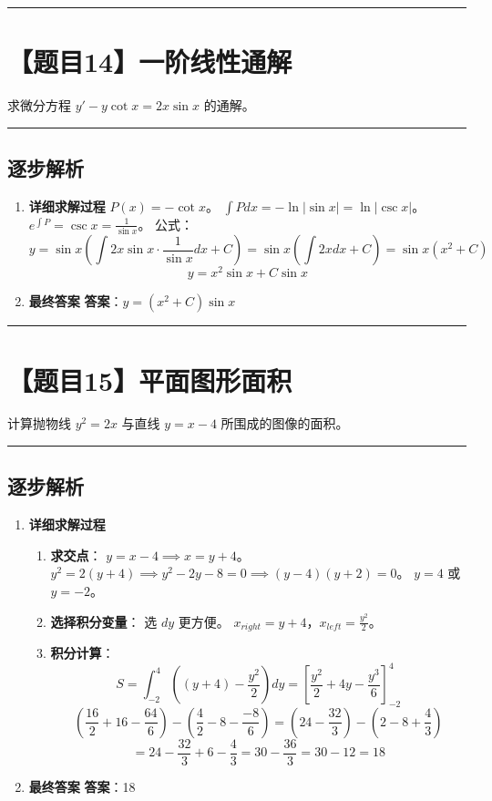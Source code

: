 \documentclass[UTF8]{ctexart}
\newenvironment{redenv}{\color{red}}{}
\newenvironment{detailedanalysis}{%
    \color{red}
    \begin{enumerate}[label=\textbf{第\arabic*步：}, leftmargin=*, align=left, itemsep=1.5ex]
}{%
    \end{enumerate}
}
\newcommand{\problemrule}{\noindent\rule{\textwidth}{1.5pt}\vspace{-0.8em}}
\newcommand{\analysisrule}{\noindent\rule{\textwidth}{0.8pt}\vspace{-0.8em}}
\begin{document}
\problemrule
\section*{【题目14】一阶线性通解}
求微分方程 $ y' - y \cot x = 2x \sin x $ 的通解。

\begin{redenv}
\analysisrule
\subsection*{逐步解析}

\begin{detailedanalysis}
\item \textbf{详细求解过程}
$P(x) = -\cot x$。
$\int P dx = -\ln|\sin x| = \ln |\csc x|$。
$e^{\int P} = \csc x = \frac{1}{\sin x}$。
公式：
$$ y = \sin x (\int 2x \sin x \cdot \frac{1}{\sin x} dx + C) = \sin x (\int 2x dx + C) = \sin x (x^2 + C) $$
$$ y = x^2 \sin x + C \sin x $$

\item \textbf{最终答案}
\textbf{答案}：$ y = (x^2 + C) \sin x $
\end{detailedanalysis}
\end{redenv}

\problemrule
\section*{【题目15】平面图形面积}
计算抛物线 $ y^{2} = 2x $ 与直线 $ y = x - 4 $ 所围成的图像的面积。

\begin{redenv}
\analysisrule
\subsection*{逐步解析}

\begin{detailedanalysis}
\item \textbf{详细求解过程}
\begin{enumerate}[label=(\arabic*)]
\item \textbf{求交点}：
$y = x-4 \implies x = y+4$。
$y^2 = 2(y+4) \implies y^2 - 2y - 8 = 0 \implies (y-4)(y+2) = 0$。
$y = 4$ 或 $y = -2$。
\item \textbf{选择积分变量}：
选 $dy$ 更方便。
$x_{right} = y+4$，$x_{left} = \frac{y^2}{2}$。
\item \textbf{积分计算}：
$$ S = \int_{-2}^4 ((y+4) - \frac{y^2}{2}) dy = [\frac{y^2}{2} + 4y - \frac{y^3}{6}]_{-2}^4 $$
$$ (\frac{16}{2} + 16 - \frac{64}{6}) - (\frac{4}{2} - 8 - \frac{-8}{6}) = (24 - \frac{32}{3}) - (2 - 8 + \frac{4}{3}) $$
$$ = 24 - \frac{32}{3} + 6 - \frac{4}{3} = 30 - \frac{36}{3} = 30 - 12 = 18 $$
\end{enumerate}

\item \textbf{最终答案}
\textbf{答案}：18
\end{detailedanalysis}
\end{redenv}
\end{document}
